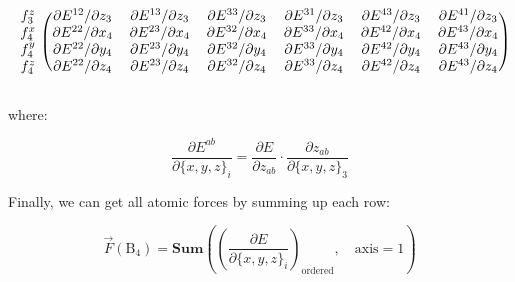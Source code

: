 \begin{eqnarray}
\begin{blockarray}{ccccccc}
\begin{block}{c(cccccc)}
f^z_3 &
\partial{E^{12}} / \partial{z_3} & \partial{E^{13}} / \partial{z_3} &
\partial{E^{33}} / \partial{z_3} & \partial{E^{31}} / \partial{z_3} &
\partial{E^{43}} / \partial{z_3} & \partial{E^{41}} / \partial{z_3} \\
%
f^x_4 &
\partial{E^{22}} / \partial{x_4} & \partial{E^{23}} / \partial{x_4} &
\partial{E^{32}} / \partial{x_4} & \partial{E^{33}} / \partial{x_4} &
\partial{E^{42}} / \partial{x_4} & \partial{E^{43}} / \partial{x_4} \\
f^y_4 &
\partial{E^{22}} / \partial{y_4} & \partial{E^{23}} / \partial{y_4} &
\partial{E^{32}} / \partial{y_4} & \partial{E^{33}} / \partial{y_4} &
\partial{E^{42}} / \partial{y_4} & \partial{E^{43}} / \partial{y_4} \\
f^z_4 &
\partial{E^{22}} / \partial{z_4} & \partial{E^{23}} / \partial{z_4} &
\partial{E^{32}} / \partial{z_4} & \partial{E^{33}} / \partial{z_4} &
\partial{E^{42}} / \partial{z_4} & \partial{E^{43}} / \partial{z_4} \\
\end{block}
\end{blockarray}
\end{eqnarray}

\noindent where:

\begin{equation}
\frac{\partial{E^{ab}}}{\partial{\{x, y, z\}_i}} = 
\frac{\partial{E}}{\partial{z_{ab}}}
\cdot
\frac{\partial{z_{ab}}}{\partial{\{x, y, z\}_3}}
\end{equation}

\noindent Finally, we can get all atomic forces by summing up each row:

\begin{equation}
\vec{F}(\mathrm{B}_{4}) = 
\mathbf{Sum}\left(
\left(
	\frac{\partial{E}}{\partial{\{x, y, z\}_i}}
\right)_{\mathrm{ordered}}, \quad \mathrm{axis} = 1
\right)
\end{equation}
